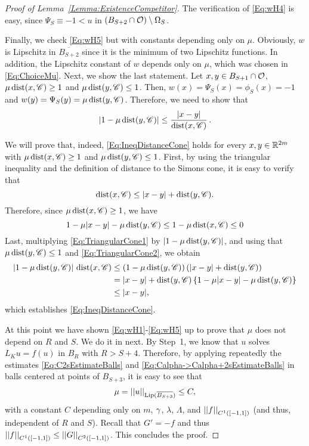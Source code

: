 \begin{proof}[Proof of Lemma~\ref{Lemma:ExistenceCompetitor}]
	The verification of \eqref{Eq:wH4} is easy, since $\Psi_S \equiv-1 < u$ in $(B_{S+2}\cap \mathcal{O})\setminus \Omega_S$.
	
	Finally, we check \eqref{Eq:wH5} but with constants depending only on $\mu$. Obviously, $w$ is Lipschitz in $\overline{B_{S+2}}$ since it is the minimum of two Lipschitz functions. In addition, the Lipschitz constant of $w$ depends only on $\mu$, which was chosen in \eqref{Eq:ChoiceMu}. Next, we show the last statement. Let $x,y \in B_{S+1}\cap \mathcal{O}$, $\mu \operatorname{dist}(x,\mathscr{C})\geq 1$ and $\mu \operatorname{dist}(y,\mathscr{C})\leq 1$. Then, $w(x)= \Psi_S(x) = \phi_S(x) = -1$ and $w(y)=\Psi_S(y) = \mu \operatorname{dist}(y,\mathscr{C})$. Therefore, we need to show that
	\begin{equation}
	\label{Eq:IneqDistanceCone}
	|1-\mu \operatorname{dist}(y,\mathscr{C})|\leq \dfrac{|x-y|}{\operatorname{dist}(x,\mathscr{C})}\,.
	\end{equation}
	
	We will prove that, indeed, \eqref{Eq:IneqDistanceCone} holds for every $x,y \in \mathbb{R}^{2m}$ with $\mu \operatorname{dist}(x,\mathscr{C})\geq 1$ and $\mu \operatorname{dist}(y,\mathscr{C})\leq 1$. First, by using the triangular inequality and the definition of distance to the Simons cone, it is easy to verify that
	\begin{equation} 
	\label{Eq:TriangularCone1}
	\operatorname{dist}(x,\mathscr{C}) \leq |x-y| + \operatorname{dist}(y,\mathscr{C}).
	\end{equation}
	Therefore, since $\mu \operatorname{dist}(x,\mathscr{C})\geq 1$, we have
	\begin{equation} 
	\label{Eq:TriangularCone2}
	1-\mu |x-y|- \mu \operatorname{dist}(y,\mathscr{C}) \leq 1-\mu\operatorname{dist}(x,\mathscr{C}) \leq 0
	\end{equation}
	Last, multiplying \eqref{Eq:TriangularCone1} by $|1-\mu\operatorname{dist}(y,\mathscr{C})|$, and using that $\mu \operatorname{dist}(y,\mathscr{C})\leq 1$ and \eqref{Eq:TriangularCone2}, we obtain
	\begin{align*}
	|1-\mu\operatorname{dist}(y,\mathscr{C})|\,\operatorname{dist}(x,\mathscr{C}) &\leq (1-\mu\operatorname{dist}(y,\mathscr{C})) \left(|x-y| + \operatorname{dist}(y,\mathscr{C})\right) \\
	&= |x-y|+\operatorname{dist}(y,\mathscr{C}) \left\{ 1 -\mu |x-y|- \mu \operatorname{dist}(y,\mathscr{C}) \right\} \\
	&\leq |x-y|,
	\end{align*}
	which establishes \eqref{Eq:IneqDistanceCone}.
	
	At this point we have shown \eqref{Eq:wH1}-\eqref{Eq:wH5} up to prove that $\mu$ does not depend on $R$ and $S$. We do it in next.	By Step~1, we know that $u$ solves $L_K u = f(u)$ in $B_R$ with $R> S+4$. Therefore, by applying repeatedly the estimates \eqref{Eq:C2sEstimateBalls} and \eqref{Eq:Calpha->Calpha+2sEstimateBalls} in balls centered at points of $B_{S+3}$, it is easy to see that
	$$
	\mu = \left | \left |{u} \right | \right |_{\mathrm{Lip}(\overline{B_{S+3}})} \leq C,
	$$ 
	with a constant $C$ depending only on $m$, $\gamma$, $\lambda$, $\Lambda$, and $\left | \left |{f} \right | \right |_{C^1([-1,1])}$ (and thus, independent of $R$ and $S$). Recall that $G' = -f$ and thus $\left | \left |{f} \right | \right |_{C^1([-1,1])} \leq \left | \left |{G} \right | \right |_{C^2([-1,1])}$. This concludes the proof.	
\end{proof}



